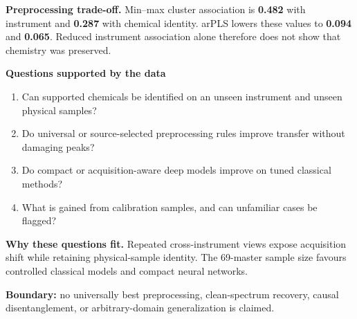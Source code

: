\documentclass[10pt]{article}
\begin{document}
\begin{center}
\resizebox{.64\linewidth}{!}{}
\end{center}

\begin{minipage}[t]{.43\linewidth}
\begin{center}
\resizebox{.72\linewidth}{!}{}
\end{center}
\end{minipage}\hfill
\begin{minipage}[t]{.555\linewidth}
\textbf{Preprocessing trade-off.} Min--max cluster association is \textbf{0.482} with instrument and \textbf{0.287} with chemical identity. arPLS lowers these values to \textbf{0.094} and \textbf{0.065}. Reduced instrument association alone therefore does not show that chemistry was preserved.

\textbf{Questions supported by the data}
\begin{enumerate}
\item Can supported chemicals be identified on an unseen instrument and unseen physical samples?
\item Do universal or source-selected preprocessing rules improve transfer without damaging peaks?
\item Do compact or acquisition-aware deep models improve on tuned classical methods?
\item What is gained from calibration samples, and can unfamiliar cases be flagged?
\end{enumerate}

\textbf{Why these questions fit.} Repeated cross-instrument views expose acquisition shift while retaining physical-sample identity. The 69-master sample size favours controlled classical models and compact neural networks.
\end{minipage}

\vspace{3pt}

{\scriptsize\color{briefgray}\textbf{Boundary:} no universally best preprocessing, clean-spectrum recovery, causal disentanglement, or arbitrary-domain generalization is claimed.}
\end{document}
